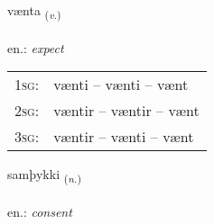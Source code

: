 \documentclass[frontgrid, backgrid]{flacards}\usepackage[]{graphicx}\usepackage[]{xcolor}
\begin{document}
\renewcommand{\flhead}{\vskip5pt \fboxsep=0pt {\small\bfseries\footnotesize Sagnorð | Verb}}
\renewcommand{\fcfoot}{\vskip5pt \fboxsep=0pt \hspace{2pt}{\small\bfseries\footnotesize 2K}}

\renewcommand{\blhead}{\vskip5pt {\small\bfseries\footnotesize Sagnorð | Verb }}
\renewcommand{\bcfoot}{\vskip5pt \hspace{2pt}{\small\bfseries\footnotesize 2K}}


{vænta \small{\textsubscript{(\textit{v.})}} \\[1ex] %
\textphonetic{[vain̥ta]} \\
en.: \emph{expect} \\  [2ex]
\renewcommand*{\arraystretch}{0.8}
\begin{tabular}{p{1cm}l}
\textsc{1sg}: & vænti -- vænti -- vænt \\ 
\textsc{2sg}: & væntir -- væntir -- vænt \\ 
\textsc{3sg}: & væntir -- vænti -- vænt \\ 
\end{tabular}
}

\renewcommand{\flhead}{\vskip5pt \fboxsep=0pt {\small\bfseries\footnotesize Nafnorð | Noun}}
\renewcommand{\fcfoot}{\vskip5pt \fboxsep=0pt \hspace{2pt}{\small\bfseries\footnotesize 2K}}

\renewcommand{\blhead}{\vskip5pt {\small\bfseries\footnotesize Nafnorð | Noun }}
\renewcommand{\bcfoot}{\vskip5pt \hspace{2pt}{\small\bfseries\footnotesize 2K}}


{samþykki \small{\textsubscript{(\textit{n.})}} \\[1ex] %
\textphonetic{[samθɪhcɪ]} \\
en.: \emph{consent} \\  [2ex]
\renewcommand*{\arraystretch}{0.8}
}
\end{document}
